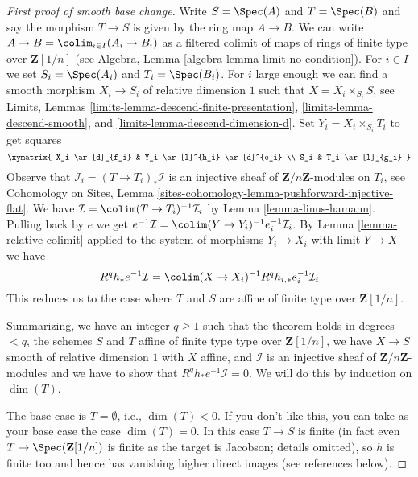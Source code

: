 \begin{proof}[First proof of smooth base change]
\medskip\noindent
Write $S = \Spec(A)$ and $T = \Spec(B)$ and say the morphism
$T \to S$ is given by the ring map $A \to B$. We can write
$A \to B = \colim_{i \in I} (A_i \to B_i)$ as a filtered
colimit of maps of rings of finite type over $\mathbf{Z}[1/n]$
(see Algebra, Lemma \ref{algebra-lemma-limit-no-condition}).
For $i \in I$ we set $S_i = \Spec(A_i)$ and $T_i = \Spec(B_i)$.
For $i$ large enough we can find a smooth morphism $X_i \to S_i$
of relative dimension $1$ such that $X = X_i \times_{S_i} S$, see
Limits, Lemmas \ref{limits-lemma-descend-finite-presentation},
\ref{limits-lemma-descend-smooth}, and
\ref{limits-lemma-descend-dimension-d}. Set $Y_i = X_i \times_{S_i} T_i$
to get squares
$$
\xymatrix{
X_i \ar[d]_{f_i} & Y_i \ar[l]^{h_i} \ar[d]^{e_i} \\
S_i & T_i \ar[l]_{g_i}
}
$$
Observe that $\mathcal{I}_i = (T \to T_i)_*\mathcal{I}$
is an injective sheaf of $\mathbf{Z}/n\mathbf{Z}$-modules on
$T_i$, see Cohomology on Sites, Lemma
\ref{sites-cohomology-lemma-pushforward-injective-flat}.
We have $\mathcal{I} = \colim (T \to T_i)^{-1}\mathcal{I}_i$
by Lemma \ref{lemma-linus-hamann}. Pulling back by $e$ we get
$e^{-1}\mathcal{I} = \colim (Y \to Y_i)^{-1}e_i^{-1}\mathcal{I}_i$.
By Lemma \ref{lemma-relative-colimit} applied to the system
of morphisms $Y_i \to X_i$ with limit $Y \to X$ we have
$$
R^qh_*e^{-1}\mathcal{I} =
\colim (X \to X_i)^{-1} R^qh_{i, *} e_i^{-1}\mathcal{I}_i
$$
This reduces us to the case where $T$ and $S$ are affine of finite
type over $\mathbf{Z}[1/n]$.

\medskip\noindent
Summarizing, we have an integer $q \geq 1$ such that the theorem holds
in degrees $< q$, the schemes $S$ and $T$ affine of finite type
type over $\mathbf{Z}[1/n]$, we have
$X \to S$ smooth of relative dimension $1$ with $X$ affine, and
$\mathcal{I}$ is an injective sheaf of $\mathbf{Z}/n\mathbf{Z}$-modules
and we have to show that $R^qh_*e^{-1}\mathcal{I} = 0$.
We will do this by induction on $\dim(T)$.

\medskip\noindent
The base case is $T = \emptyset$, i.e., $\dim(T) < 0$.
If you don't like this, you can take as your base case
the case $\dim(T) = 0$. In this case $T \to S$ is finite
(in fact even $T \to \Spec(\mathbf{Z}[1/n])$ is finite as the
target is Jacobson; details omitted), so
$h$ is finite too and hence has
vanishing higher direct images (see references below).


\end{proof}
